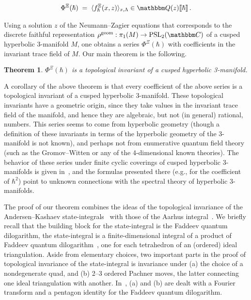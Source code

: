 \documentclass[12pt,reqno]{amsart}
\newtheorem{theorem}{Theorem}[section]
\theoremstyle{definition}
\def\BQ{\mathbbm Q}
\def\BC{\mathbbm C}
\def\PSL{\mathrm{PSL}}
\def\be{\begin{equation}}
\def\ee{\end{equation}}
\def\geom{\mathrm{geom}}
\renewcommand{\=}{\;=\;}
\begin{document}
\be
\label{Phidef}
\Phi^\Xi(\hbar) \= \langle f^\Xi_{\hbar}(x,z) \rangle_{x, \Lambda}
\in \BQ(z)\llbracket \hbar \rrbracket\,.
\ee

Using a solution $z$ of the Neumann--Zagier equations that corresponds to
the discrete faithful representation $\rho^\geom: \pi_1(M) \to \PSL_2(\BC)$
of a cusped hyperbolic 3-manifold $M$, one obtains a series $\Phi^\Xi(\hbar)$
with coefficients in the invariant trace field of $M$.
Our main theorem is the following.

\begin{theorem}
\label{thm.1}
$\Phi^\Xi(\hbar)$ is a topological invariant of a cusped hyperbolic 3-manifold.
\end{theorem}

A corollary of the above theorem is that every coefficient of the above
series is a topological invariant of a cusped hyperbolic 3-manifold. These
topological invariants have a geometric origin, since they take values in
the invariant trace field of the manifold, and hence they are algebraic, but
not (in general) rational, numbers. This series seems to come from 
hyperbolic geometry (though a definition of these invariants in terms of the
hyperbolic geometry of the 3-manifold is not known), and perhaps not from enumerative
quantum field theory (such as the Gromov--Witten or any of the 4-dimensional
known theories). The behavior of these series under finite cyclic coverings of
cusped hyperbolic 3-manifolds is given in~\cite{GY:1loop.torsion}, and the
formulas presented there (e.g., for the coefficient of $\hbar^2$) point to
unknown connections with the spectral theory of hyperbolic 3-manifolds.

The proof of our theorem combines the ideas of the topological invariance of the
Andersen--Kashaev state-integrals~\cite{AK} with those of the Aarhus
integral~\cite{AarhusII}. We briefly recall that the building block for the
state-integral is the Faddeev quantum
dilogarithm, the state-integral is a finite-dimensional integral of a product of
Faddeev quantum dilogarithm~\cite{Faddeev}, one for each tetrahedron of an (ordered)
ideal triangulation. Aside from elementary choices, two important parts
in the proof of topological invariance of the state-integral is
invariance under (a) the choice of a nondegenerate quad, and
(b) 2--3 ordered Pachner moves, the latter connecting one ideal triangulation
with another. In~\cite{AK}, (a) and (b) are dealt with a Fourier transform and
a pentagon identity for the Faddeev quantum dilogarithm.
\end{document}
